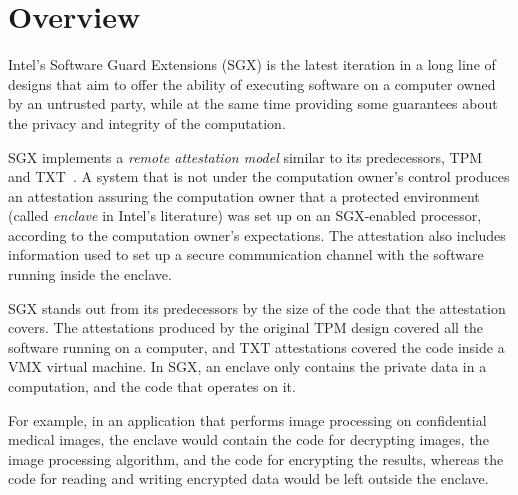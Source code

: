 \section{Overview}
\label{sec:intro}

Intel's Software Guard Extensions (SGX) is the latest iteration in a long line
of designs that aim to offer the ability of executing software on a computer
owned by an untrusted party, while at the same time providing some guarantees
about the privacy and integrity of the computation.

SGX implements a \textit{remote attestation model} similar to its predecessors,
TPM~\cite{grawrock2003tpm} and TXT~\cite{grawrock2009txt}. A system that is not
under the computation owner's control produces an attestation assuring the
computation owner that a protected environment (called \textit{enclave} in
Intel's literature) was set up on an SGX-enabled processor, according to the
computation owner's expectations. The attestation also includes information
used to set up a secure communication channel with the software running inside
the enclave.

SGX stands out from its predecessors by the size of the code that the
attestation covers. The attestations produced by the original TPM design
covered all the software running on a computer, and TXT attestations covered
the code inside a VMX \cite{uhlig2005vmx} virtual machine. In SGX, an enclave
only contains the private data in a computation, and the code that operates on
it.

For example, in an application that performs image processing on confidential
medical images, the enclave would contain the code for decrypting images,
the image processing algorithm, and the code for encrypting the results,
whereas the code for reading and writing encrypted data would be left outside
the enclave.
